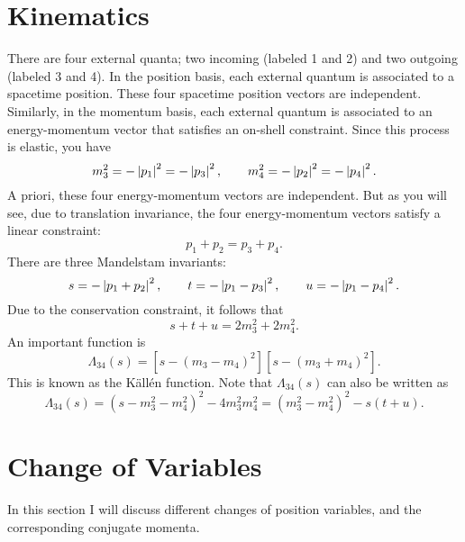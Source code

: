 \section{Kinematics}
There are four external quanta; two incoming (labeled 1 and 2) and two outgoing (labeled 3 and 4). In the position basis, each external quantum is associated to a spacetime position. These four spacetime position vectors are independent. Similarly, in the momentum basis, each external quantum is associated to an energy-momentum vector that satisfies an on-shell constraint. Since this process is elastic, you have
\begin{equation}
	m_{3}^{2} = -\left\lvert p_{1} \right\rvert^{2} = -\left\lvert p_{3} \right\rvert^{2}, \qquad m_{4}^{2} = -\left\lvert p_{2} \right\rvert^{2} = -\left\lvert p_{4} \right\rvert^{2}.
\end{equation}
A priori, these four energy-momentum vectors are independent. But as you will see, due to translation invariance, the four energy-momentum vectors satisfy a linear constraint:
\begin{equation}
	p_{1} + p_{2} = p_{3} + p_{4}.
\end{equation}
There are three Mandelstam invariants:
\begin{equation}
	s = -\left\lvert p_{1} + p_{2} \right\rvert^{2}, \qquad t = -\left\lvert p_{1} - p_{3} \right\rvert^{2}, \qquad u = -\left\lvert p_{1} - p_{4} \right\rvert^{2}.
\end{equation}
Due to the conservation constraint, it follows that
\begin{equation}
	s + t + u = 2 m_{3}^{2} + 2 m_{4}^{2}.
\end{equation}
An important function is
\begin{equation}
	\Lambda_{34}(s) = \left[s - (m_{3} - m_{4})^{2}\right] \left[s - (m_{3} + m_{4})^{2}\right].
\end{equation}
This is known as the K\"{a}ll\'{e}n function. Note that $\Lambda_{34}(s)$ can also be written as
\begin{equation}
	\Lambda_{34}(s) = \left(s - m_{3}^{2} - m_{4}^{2}\right)^{2} - 4 m_{3}^{2} m_{4}^{2} = \left(m_{3}^{2} - m_{4}^{2} \right)^{2} - s \left(t + u\right).
\end{equation}
\section{Change of Variables}
In this section I will discuss different changes of position variables, and the corresponding conjugate momenta.
